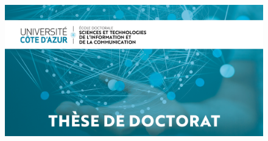 \pagestyle{plain}
\begin{figure}[t]
    \vspace*{-2.7cm}
    \begin{adjustwidth}{-28mm}{-21mm}
      \includegraphics[width=\paperwidth]{./part1/figures/UCA_STIC.jpg}
    \end{adjustwidth}
  \end{figure} 

